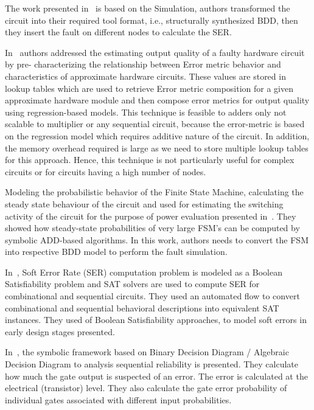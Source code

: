 The work presented in~\citep{ubar2014modeling} is based on the Simulation, authors transformed the circuit into their required tool format, i.e., structurally synthesized BDD, then they
insert the fault on different nodes to calculate the SER. 



In~\citep{chan2013statistical} authors addressed the estimating output quality of a faulty hardware circuit by pre-
characterizing the relationship between Error metric behavior and characteristics of approximate
hardware circuits. These values are stored in lookup tables which are used to retrieve Error metric
composition for a given approximate hardware module and then compose error metrics for output
quality using regression-based models. This technique is feasible to adders only not scalable to multiplier or any sequential circuit, because the error-metric is based on the regression model which requires additive nature of the circuit. In addition, the memory overhead required is large as we need to store multiple lookup tables for this approach. Hence, this technique is not particularly useful for complex circuits or for circuits having a high number of nodes.



Modeling the probabilistic behavior of the Finite State Machine, calculating the steady state
behaviour of the circuit and used for estimating the switching activity of the circuit for the purpose of
power evaluation presented in~\citep{hachtel1996markovian}. They showed how steady-state probabilities of very large FSM’s can be computed by
symbolic ADD-based algorithms. In this work, authors needs to convert the FSM into respective BDD model to perform the fault simulation.


In~\citep{shazli2011high}, Soft Error Rate (SER) computation problem is modeled as a Boolean
Satisfiability problem and SAT solvers are used to compute SER for combinational and
sequential circuits. They used an automated flow to convert combinational and sequential behavioral
descriptions into equivalent SAT instances. They used of Boolean Satisfiability approaches, to
model soft errors in early design stages presented.



In~\citep{miskov2007mars}, the symbolic framework based on Binary Decision Diagram / Algebraic Decision
Diagram to analysis sequential reliability is presented. They calculate how much the
gate output is suspected of an error. The error is calculated at the electrical (transistor) level. They also calculate the gate error probability of individual gates associated
with different input probabilities. 


